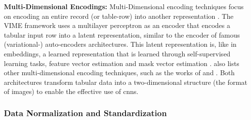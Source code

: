 
\textbf{Multi-Dimensional Encodings:}
Multi-Dimensional encoding techniques focus on encoding an entire record (or table-row) into another representation \cite{borisov2022DeepNeuralNetworks}.
The VIME framework \cite{yoon2020VIMEExtendingSuccess} uses a multilayer perceptron as an encoder that encodes a tabular input row into a latent representation, 
similar to the encoder of famous (variational-) auto-encoders \cite{kingma2013AutoEncodingVariationalBayes} architectures.
This latent representation is, like in embeddings, a learned representation that is learned through self-supervised learning tasks, feature vector estimation and mask vector estimation \cite{yoon2020VIMEExtendingSuccess}.
\cite{borisov2022DeepNeuralNetworks} also lists other multi-dimensional encoding techniques, such as the works of \cite{zhu2021ConvertingTabularData} and \cite{sun2019supertml}.
Both architectures transform tabular data into a two-dimensional structure (\eg the format of images) to enable the effective use of \glspl{cnn}.


\subsubsection{Data Normalization and Standardization}
\label{sec:dataNormalization} 

